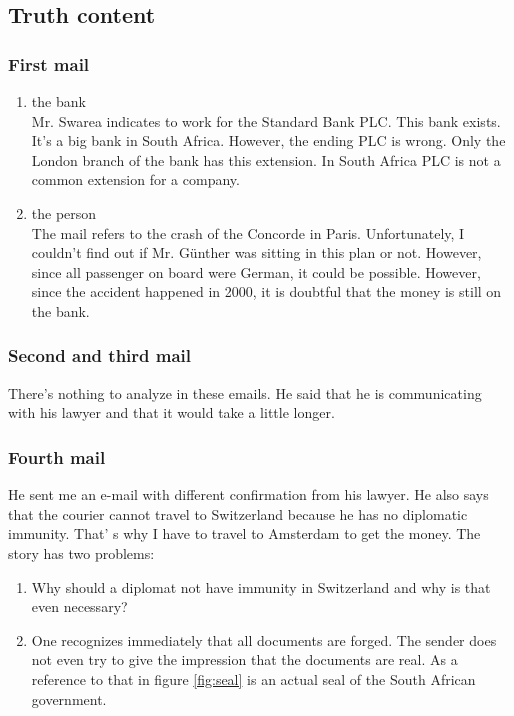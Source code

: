 \documentclass[12pt]{article}
\begin{document}
\subsection{Truth content}
\subsubsection{First mail}
\begin{enumerate}
\item the bank\\
Mr. Swarea indicates to work for the Standard Bank PLC. This bank exists. It’s a big bank in South Africa. However, the ending PLC is wrong. Only the London branch of the bank has this extension. In South Africa PLC is not a common extension for a company.
\item the person\\
The mail refers to the crash of the Concorde in Paris. Unfortunately, I couldn’t find out if Mr. Günther was sitting in this plan or not. However, since all passenger on board were German, it could be possible. However, since the accident happened in 2000, it is doubtful that the money is still on the bank.
\end{enumerate}

\subsubsection{Second and third mail}
There's nothing to analyze in these emails. He said that he is communicating with his lawyer and that it would take a little longer.

\subsubsection{Fourth mail}
He sent me an e-mail with different confirmation from his lawyer. He also says that the courier cannot travel to Switzerland because he has no diplomatic immunity. That' s why I have to travel to Amsterdam to get the money.  The story has two problems:

\begin{enumerate}
\item Why should a diplomat not have immunity in Switzerland and why is that even necessary?
\item One recognizes immediately that all documents are forged. The sender does not even try to give the impression that the documents are real. As a reference to that in figure \ref{fig:seal} is an actual seal of the South African government.
\end{enumerate}
\end{document}
